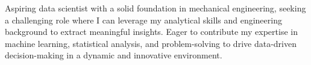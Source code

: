 




Aspiring data scientist with a solid foundation in mechanical engineering, seeking a challenging role where I can leverage my analytical skills and engineering background to extract meaningful insights.
Eager to contribute my expertise in machine learning, statistical analysis, and problem-solving to drive data-driven decision-making in a dynamic and innovative environment.

